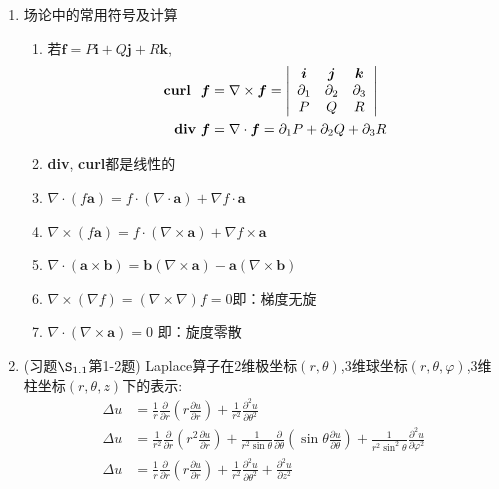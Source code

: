 \documentclass[12pt, a4paper]{ctexbook}
\newcommand{\curl}{\text{\bf curl }}
\begin{document}
\begin{itemize}
\begin{enumerate}
            \item 场论中的常用符号及计算
            \begin{enumerate}
                \item 若$\bm f = P \bm i + Q \bm j + R \bm k $,
                \begin{align*}
                \curl\ \bm f &= \nabla \times \bm f = \left|
                \begin{array}{ccc}
                \bm i & \bm j & \bm k \\
                \partial_1 & \partial_2 & \partial_3 \\
                P & Q & R
                \end{array} \right| \\
                \text{\bf div}\ \bm f &= \nabla \cdot \bm f = \partial_1  P + \partial_2  Q + \partial_3  R
                \end{align*}
                \item {\bf div}, {\bf curl}都是线性的
                \item $ \nabla \cdot (f\bm a) = f \cdot (\nabla \cdot \bm a) + \nabla f \cdot \bm a$
                \item $ \nabla \times (f\bm a) = f \cdot(\nabla\times\bm a) + \nabla f \times \bm a$
                \item $ \nabla \cdot (\bm a \times \bm b) = \bm b (\nabla\times\bm a) - \bm a (\nabla\times\bm b)$
                \item $\nabla\times(\nabla f) = (\nabla \times \nabla) f = 0$\qquad 即：梯度无旋
                \item $\nabla \cdot (\nabla \times\bm a) = 0$ \qquad 即：旋度零散
                
            \end{enumerate}
            \item (习题$\S_{1.1}$第1-2题) Laplace算子在2维极坐标$(r, \theta)$,3维球坐标$(r, \theta, \varphi)$,3维柱坐标$(r, \theta, z)$下的表示:
            \begin{align*}
            \Delta u &= \frac1r \frac{\partial}{\partial r}(r\frac{\partial u}{\partial r}) + \frac1{r^2} \frac{\partial^2 u}{\partial \theta^2}\\
            \Delta u &= \frac1{r^2} \frac\partial{\partial r}(r^2\frac{\partial u}{\partial r}) + \frac1{r^2\sin\theta}\frac\partial{\partial \theta}(\sin\theta\frac{\partial u}{\partial\theta}) + \frac1{r^2\sin^2\theta}\frac{\partial^2u}{\partial\varphi^2}\\
            \Delta u &= \frac1r \frac\partial{\partial r}(r\frac{\partial u}{\partial r}) + \frac1{r^2}\frac{\partial^2u}{\partial\theta^2} + \frac{\partial^2u}{\partial z^2}
            \end{align*}
            

\end{enumerate}
\end{itemize}
\end{document}

